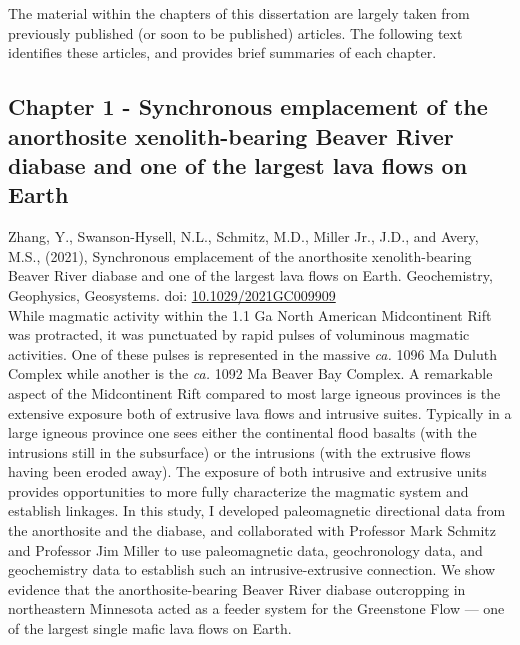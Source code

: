 \documentclass{ucbthesis}
\begin{document}
\begin{frontmatter}

\tableofcontents
\clearpage
\listoffigures
\clearpage
\listoftables

\clearpage

\begin{preface}

The material within the chapters of this dissertation are largely taken from previously published (or soon to be published) articles. The following text identifies these articles, and provides brief summaries of each chapter.

\subsection{Chapter 1 - Synchronous emplacement of the anorthosite xenolith-bearing Beaver River diabase and one of the largest lava flows on Earth}

Zhang, Y., Swanson-Hysell, N.L., Schmitz, M.D., Miller Jr., J.D., and Avery, M.S., (2021), Synchronous emplacement of the anorthosite xenolith-bearing Beaver River diabase and one of the largest lava flows on Earth. Geochemistry, Geophysics, Geosystems. doi: \url{10.1029/2021GC009909}
\\

While magmatic activity within the 1.1 Ga North American Midcontinent Rift was protracted, it was punctuated by rapid pulses of voluminous magmatic activities. One of these pulses is represented in the massive \textit{ca.} 1096 Ma Duluth Complex while another is the \textit{ca.} 1092 Ma Beaver Bay Complex. A remarkable aspect of the Midcontinent Rift compared to most large igneous provinces is the extensive exposure both of extrusive lava flows and intrusive suites. Typically in a large igneous province one sees either the continental flood basalts (with the intrusions still in the subsurface) or the intrusions (with the extrusive flows having been eroded away). The exposure of both intrusive and extrusive units provides opportunities to more fully characterize the magmatic system and establish linkages. In this study, I developed paleomagnetic directional data from the anorthosite and the diabase, and collaborated with Professor Mark Schmitz and Professor Jim Miller to use paleomagnetic data, geochronology data, and geochemistry data to establish such an intrusive-extrusive connection. We show evidence that the anorthosite-bearing Beaver River diabase outcropping in northeastern Minnesota acted as a feeder system for the Greenstone Flow --- one of the largest single mafic lava flows on Earth.


\end{preface}
\end{frontmatter}
\end{document}
